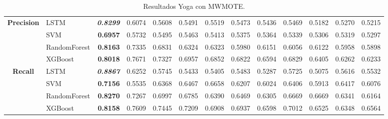 \begin{table}[H]
\begin{adjustbox}{max width=14cm}
\begin{tabular}{|c|l|r|r|r|r|r|r|r|r|r|r|r|}
			\hline
			\textbf{Precision} &  LSTM & \textit{ \textbf{  0.8299 } } &  0.6074 &  0.5608 &  0.5491 &  0.5519 &  0.5473 &  0.5436 &  0.5469 &  0.5182 &  0.5270 &  0.5215 \\
			&  SVM & \textbf{  0.6957 } &  0.5732 &  0.5495 &  0.5463 &  0.5413 &  0.5375 &  0.5364 &  0.5339 &  0.5306 &  0.5319 &  0.5297 \\
			&  RandomForest & \textbf{  0.8163 } &  0.7335 &  0.6831 &  0.6324 &  0.6323 &  0.5980 &  0.6151 &  0.6056 &  0.6122 &  0.5958 &  0.5898 \\
			&  XGBoost & \textbf{  0.8018 } &  0.7671 &  0.7327 &  0.6957 &  0.6852 &  0.6822 &  0.6594 &  0.6829 &  0.6405 &  0.6262 &  0.6233 \\
			\hline
			\textbf{Recall} &  LSTM & \textit{ \textbf{  0.8867 } } &  0.6252 &  0.5745 &  0.5433 &  0.5405 &  0.5483 &  0.5287 &  0.5725 &  0.5075 &  0.5616 &  0.5532 \\
			&  SVM & \textbf{  0.7156 } &  0.5535 &  0.6368 &  0.6467 &  0.6658 &  0.6207 &  0.6024 &  0.6406 &  0.5913 &  0.6417 &  0.6076 \\
			&  RandomForest & \textbf{  0.8270 } &  0.7267 &  0.6997 &  0.6785 &  0.6390 &  0.6469 &  0.6305 &  0.6669 &  0.6669 &  0.6341 &  0.6164 \\
			&  XGBoost & \textbf{  0.8158 } &  0.7609 &  0.7445 &  0.7209 &  0.6908 &  0.6937 &  0.6598 &  0.7012 &  0.6525 &  0.6348 &  0.6564 \\
			\hline
		\end{tabular}
	\end{adjustbox}
	\caption{Resultados Yoga con MWMOTE.}
	\label{tab:Yoga_MWMOTE}
\end{table}

